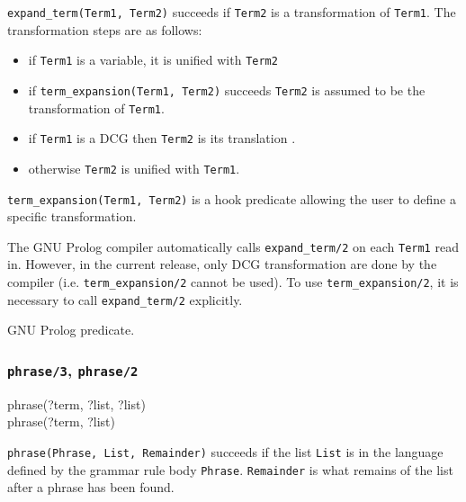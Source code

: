 \Description

\texttt{expand\_term(Term1, Term2)} succeeds if
\texttt{Term2} is a transformation of \texttt{Term1}. The transformation
steps are as follows:

\begin{itemize}

\item if \texttt{Term1} is a variable, it is unified with \texttt{Term2}

\item if \texttt{term\_expansion(Term1, Term2)} succeeds \texttt{Term2} is
  assumed to be the transformation of \texttt{Term1}.

\item if \texttt{Term1} is a DCG then \texttt{Term2} is its translation
  .

\item otherwise \texttt{Term2} is unified with \texttt{Term1}.

\end{itemize}

\texttt{term\_expansion(Term1, Term2)} is a hook predicate allowing the user
to define a specific transformation. 

The GNU Prolog compiler  automatically calls
\texttt{expand\_term/2} on each \texttt{Term1} read in. However, in the
current release, only DCG transformation are done by the compiler (i.e.
\texttt{term\_expansion/2} cannot be used). To use
\texttt{term\_expansion/2}, it is necessary to call \texttt{expand\_term/2}
explicitly.

\PlErrorsNone

\Portability

GNU Prolog predicate.

\subsubsection{\texttt{phrase/3},
               \texttt{phrase/2}}

\begin{TemplatesOneCol}
phrase(?term, ?list, ?list)\\
phrase(?term, ?list)

\end{TemplatesOneCol}

\Description

\texttt{phrase(Phrase, List, Remainder)} succeeds if the list
\texttt{List} is in the language defined by the grammar rule body
\texttt{Phrase}. \texttt{Remainder} is what remains of the list after a
phrase has been found. 

